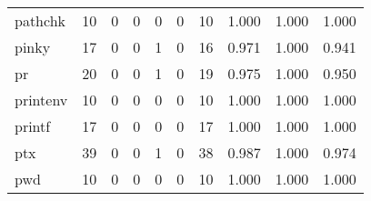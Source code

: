 \begin{longtable}{lp{2.0cm}p{2.0cm}p{2.0cm}p{2.0cm}p{2.0cm}p{2.0cm}p{2.0cm}p{2.0cm}p{2.0cm}}
pathchk   &                     10 &                                             0 &                                            0 &                                           0 &                                            0 &                                         10 &                                1.000 &                                  1.000 &                                1.000 \\
pinky     &                     17 &                                             0 &                                            0 &                                           1 &                                            0 &                                         16 &                                0.971 &                                  1.000 &                                0.941 \\
pr        &                     20 &                                             0 &                                            0 &                                           1 &                                            0 &                                         19 &                                0.975 &                                  1.000 &                                0.950 \\
printenv  &                     10 &                                             0 &                                            0 &                                           0 &                                            0 &                                         10 &                                1.000 &                                  1.000 &                                1.000 \\
printf    &                     17 &                                             0 &                                            0 &                                           0 &                                            0 &                                         17 &                                1.000 &                                  1.000 &                                1.000 \\
ptx       &                     39 &                                             0 &                                            0 &                                           1 &                                            0 &                                         38 &                                0.987 &                                  1.000 &                                0.974 \\
pwd       &                     10 &                                             0 &                                            0 &                                           0 &                                            0 &                                         10 &                                1.000 &                                  1.000 &                                1.000 \\

\end{longtable}
